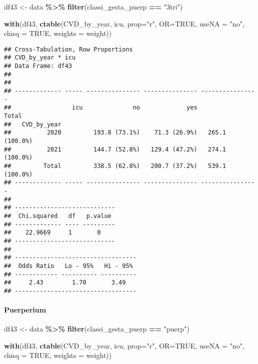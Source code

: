 \documentclass[
]{article}
\newenvironment{Shaded}{\begin{snugshade}}{\end{snugshade}}
\newcommand{\AttributeTok}[1]{\textcolor[rgb]{0.13,0.29,0.53}{#1}}
\newcommand{\ConstantTok}[1]{\textcolor[rgb]{0.56,0.35,0.01}{#1}}
\newcommand{\FunctionTok}[1]{\textcolor[rgb]{0.13,0.29,0.53}{\textbf{#1}}}
\newcommand{\NormalTok}[1]{#1}
\newcommand{\OtherTok}[1]{\textcolor[rgb]{0.56,0.35,0.01}{#1}}
\newcommand{\SpecialCharTok}[1]{\textcolor[rgb]{0.81,0.36,0.00}{\textbf{#1}}}
\newcommand{\StringTok}[1]{\textcolor[rgb]{0.31,0.60,0.02}{#1}}
\begin{document}
\begin{Shaded}
\begin{Highlighting}[]
\NormalTok{df43 }\OtherTok{\textless{}{-}}\NormalTok{ data }\SpecialCharTok{\%\textgreater{}\%} 
  \FunctionTok{filter}\NormalTok{(classi\_gesta\_puerp }\SpecialCharTok{==} \StringTok{"3tri"}\NormalTok{)}

\FunctionTok{with}\NormalTok{(df43, }\FunctionTok{ctable}\NormalTok{(CVD\_by\_year, icu, }\AttributeTok{prop=}\StringTok{"r"}\NormalTok{, }\AttributeTok{OR=}\ConstantTok{TRUE}\NormalTok{, }\AttributeTok{useNA =} \StringTok{"no"}\NormalTok{, }\AttributeTok{chisq =} \ConstantTok{TRUE}\NormalTok{,  }\AttributeTok{weights =}\NormalTok{ weight))}
\end{Highlighting}
\end{Shaded}

\begin{verbatim}
## Cross-Tabulation, Row Proportions  
## CVD_by_year * icu  
## Data Frame: df43  
## 
## 
## ------------- ----- --------------- --------------- ----------------
##                 icu              no             yes            Total
##   CVD_by_year                                                       
##          2020         193.8 (73.1%)    71.3 (26.9%)   265.1 (100.0%)
##          2021         144.7 (52.8%)   129.4 (47.2%)   274.1 (100.0%)
##         Total         338.5 (62.8%)   200.7 (37.2%)   539.1 (100.0%)
## ------------- ----- --------------- --------------- ----------------
## 
## ----------------------------
##  Chi.squared   df   p.value 
## ------------- ---- ---------
##    22.9669     1       0    
## ----------------------------
## 
## ----------------------------------
##  Odds Ratio   Lo - 95%   Hi - 95% 
## ------------ ---------- ----------
##     2.43        1.70       3.49   
## ----------------------------------
\end{verbatim}

\hypertarget{puerperium-9}{%
\paragraph{\texorpdfstring{{ Puerperium
}}{ Puerperium }}\label{puerperium-9}}

\begin{Shaded}
\begin{Highlighting}[]
\NormalTok{df43 }\OtherTok{\textless{}{-}}\NormalTok{ data }\SpecialCharTok{\%\textgreater{}\%} 
  \FunctionTok{filter}\NormalTok{(classi\_gesta\_puerp }\SpecialCharTok{==} \StringTok{"puerp"}\NormalTok{)}

\FunctionTok{with}\NormalTok{(df43, }\FunctionTok{ctable}\NormalTok{(CVD\_by\_year, icu, }\AttributeTok{prop=}\StringTok{"r"}\NormalTok{, }\AttributeTok{OR=}\ConstantTok{TRUE}\NormalTok{, }\AttributeTok{useNA =} \StringTok{"no"}\NormalTok{, }\AttributeTok{chisq =} \ConstantTok{TRUE}\NormalTok{,  }\AttributeTok{weights =}\NormalTok{ weight))}
\end{Highlighting}
\end{Shaded}
\end{document}
